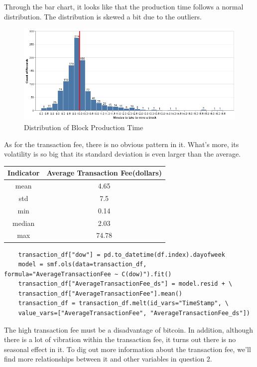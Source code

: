 \documentclass[a4paper]{article}
\begin{document}
Through the bar chart, it looks like that the production time follows a normal distribution. The distribution is skewed a bit due to the outliers.  
\begin{figure}[H]
    \centering
    \includegraphics[scale=0.5]{ProductionTimeDistribution.png}
    \caption{Distribution of Block Production Time}
\end{figure}
As for the transaction fee, there is no obvious pattern in it. What's more, its volatility is so big that its standard deviation is even larger than the average. 
\begin{table}[H]
    \centering
    \begin{tabular}{@{}|c|c|@{}}
    \hline
    Indicator   & Average Transaction Fee(dollars)  \\ \hline
    mean        & 4.65   \\ \hline
    std         & 7.5   \\ \hline
    min         & 0.14   \\ \hline
    median      & 2.03   \\ \hline
    max         & 74.78   \\ \hline
    \end{tabular}
\end{table}
\begin{verbatim}
    transaction_df["dow"] = pd.to_datetime(df.index).dayofweek
    model = smf.ols(data=transaction_df, formula="AverageTransactionFee ~ C(dow)").fit()
    transaction_df["AverageTransactionFee_ds"] = model.resid + \
    transaction_df["AverageTransactionFee"].mean()
    transaction_df = transaction_df.melt(id_vars="TimeStamp", \
    value_vars=["AverageTransactionFee", "AverageTransactionFee_ds"])
\end{verbatim}
\par The high transaction fee must be a disadvantage of bitcoin. In addition, although there is a lot of vibration within the transaction fee, it turns out there is no seasonal effect in it. To dig out more information about the transaction fee, we'll find more relationships between it and other variables in question 2.
\end{document}
